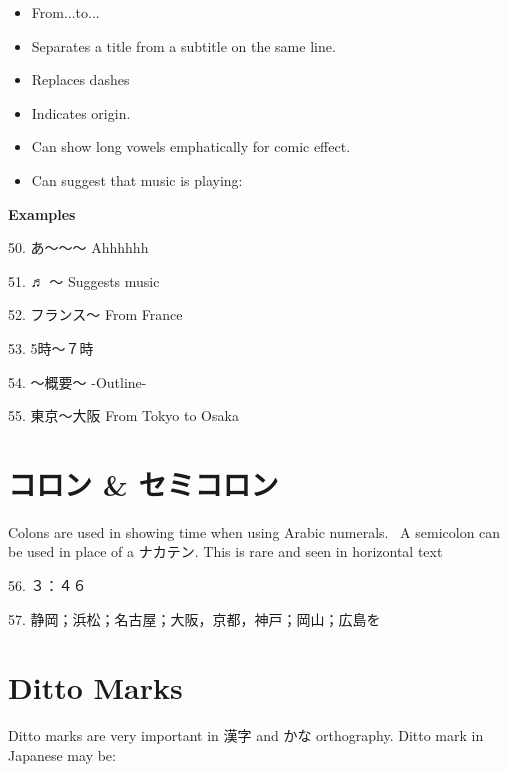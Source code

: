 \begin{itemize}
 
\item From\dothyp{}\dothyp{}\dothyp{}to\dothyp{}\dothyp{}\dothyp{}  
\item Separates a title from a subtitle on the same line.  
\item Replaces dashes  
\item Indicates origin.  
\item Can show long vowels emphatically for comic effect.  
\item Can suggest that music is playing:  
\end{itemize}

\begin{center}
\textbf{Examples } 
\end{center}

\par{50. あ〜〜〜 \hfill\break
Ahhhhhh }

\par{51. ♬ 〜 \hfill\break
Suggests music }

\par{52. フランス〜 \hfill\break
From France }

\par{53. 5時～７時 }

\par{54. 〜概要〜 \hfill\break
-Outline- }

\par{55. 東京〜大阪 \hfill\break
From Tokyo to Osaka }
      
\section{コロン \& セミコロン}
 
\par{ Colons are used in showing time when using Arabic numerals.  A semicolon can be used in place of a ナカテン. This is rare and seen in horizontal text }

\par{56. ３：４６ }

\par{57. 静岡；浜松；名古屋；大阪，京都，神戸；岡山；広島を  }
      
\section{Ditto Marks}
 
\par{ Ditto marks are very important in 漢字 and かな orthography. Ditto mark in Japanese may be: }

